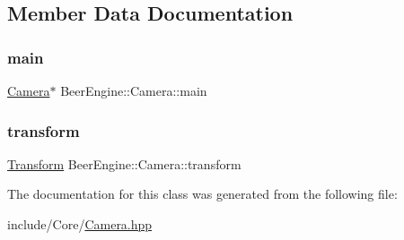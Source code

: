 \subsection{Member Data Documentation}
\mbox{\label{class_beer_engine_1_1_camera_aca558a665afcf487dc66e7deb5edba58}} 
\subsubsection{\texorpdfstring{main}{main}}
{\footnotesize\ttfamily \mbox{\hyperlink{class_beer_engine_1_1_camera}{Camera}}$\ast$ Beer\+Engine\+::\+Camera\+::main\hspace{0.3cm}{\ttfamily [static]}}

\mbox{\label{class_beer_engine_1_1_camera_a4bbec6c322e5f260eca34a98d2eaeb93}} 
\subsubsection{\texorpdfstring{transform}{transform}}
{\footnotesize\ttfamily \mbox{\hyperlink{class_beer_engine_1_1_transform}{Transform}} Beer\+Engine\+::\+Camera\+::transform}



The documentation for this class was generated from the following file\+:\begin{DoxyCompactItemize}
\item 
include/\+Core/\mbox{\hyperlink{_camera_8hpp}{Camera.\+hpp}}\end{DoxyCompactItemize}
